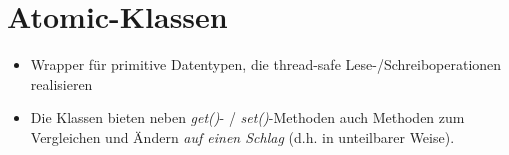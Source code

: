 \section{Atomic-Klassen}



\begin{itemize}
    \item Wrapper für primitive Datentypen, die thread-safe Lese-/Schreiboperationen realisieren
    \item Die Klassen bieten neben \textit{get()}- / \textit{set()}-Methoden auch Methoden zum Vergleichen und Ändern \textit{auf einen Schlag} (d.h. in unteilbarer Weise).
\end{itemize}
